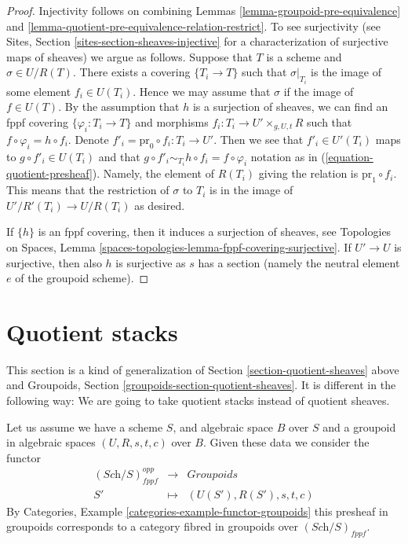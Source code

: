 \begin{proof}
Injectivity follows on combining
Lemmas \ref{lemma-groupoid-pre-equivalence} and
\ref{lemma-quotient-pre-equivalence-relation-restrict}.
To see surjectivity (see
Sites, Section \ref{sites-section-sheaves-injective}
for a characterization of surjective maps of sheaves) we argue as follows.
Suppose that $T$ is a scheme and $\sigma \in U/R(T)$.
There exists a covering $\{T_i \to T\}$ such that $\sigma|_{T_i}$
is the image of some element $f_i \in U(T_i)$. Hence we
may assume that $\sigma$ if the image of $f \in U(T)$.
By the assumption that $h$ is a surjection of sheaves, we
can find an fppf covering $\{\varphi_i : T_i \to T\}$ and morphisms
$f_i : T_i \to U' \times_{g, U, t} R$ such that
$f \circ \varphi_i = h \circ f_i$. Denote
$f'_i = \text{pr}_0 \circ f_i : T_i \to U'$. Then we see that
$f'_i \in U'(T_i)$ maps to $g \circ f'_i \in U(T_i)$ and
that $g \circ f'_i \sim_{T_i} h \circ f_i = f \circ \varphi_i$
notation as in (\ref{equation-quotient-presheaf}). Namely, the
element of $R(T_i)$ giving the relation is $\text{pr}_1 \circ f_i$.
This means that the restriction
of $\sigma$ to $T_i$ is in the image of $U'/R'(T_i) \to U/R(T_i)$
as desired.

\medskip\noindent
If $\{h\}$ is an fppf covering, then it induces a surjection of sheaves, see
Topologies on Spaces,
Lemma \ref{spaces-topologies-lemma-fppf-covering-surjective}.
If $U' \to U$ is surjective, then also $h$ is surjective as $s$ has a section
(namely the neutral element $e$ of the groupoid scheme).
\end{proof}





\section{Quotient stacks}
\label{section-stacks}

\noindent
This section is a kind of generalization of
Section \ref{section-quotient-sheaves}
above and
Groupoids, Section \ref{groupoids-section-quotient-sheaves}.
It is different in the following way:
We are going to take quotient stacks instead of quotient sheaves.

\medskip\noindent
Let us assume we have a scheme $S$, and algebraic space $B$ over $S$
and a groupoid in algebraic spaces $(U, R, s, t, c)$ over $B$. Given these data
we consider the functor
\begin{equation}
\label{equation-quotient-stack}
\begin{matrix}
(\textit{Sch}/S)_{fppf}^{opp} &
\longrightarrow &
\textit{Groupoids} \\
S' &
\longmapsto &
(U(S'), R(S'), s, t, c)
\end{matrix}
\end{equation}
By
Categories, Example \ref{categories-example-functor-groupoids}
this presheaf in groupoids corresponds to a category fibred in groupoids
over $(\textit{Sch}/S)_{fppf}$.


